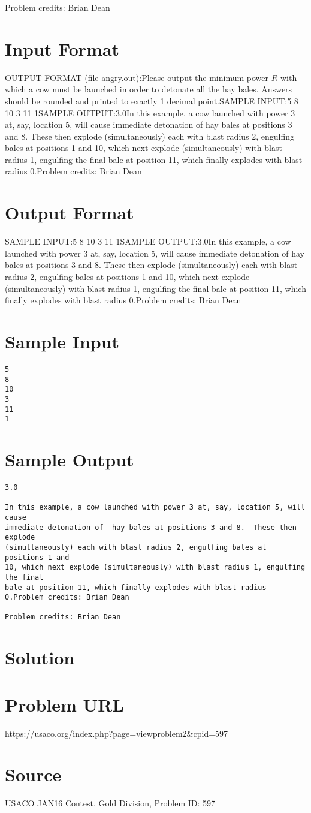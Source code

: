 \documentclass[12pt]{article}
\begin{document}
Problem credits: Brian Dean



\section*{Input Format}
OUTPUT FORMAT (file angry.out):Please output the minimum power $R$ with which a cow must be launched in order
to detonate all the hay bales.  Answers should be rounded and printed to exactly
1 decimal point.SAMPLE INPUT:5
8
10
3
11
1SAMPLE OUTPUT:3.0In this example, a cow launched with power 3 at, say, location 5, will cause
immediate detonation of  hay bales at positions 3 and 8.  These then explode
(simultaneously) each with blast radius 2, engulfing bales at positions 1 and
10, which next explode (simultaneously) with blast radius 1, engulfing the final
bale at position 11, which finally explodes with blast radius 0.Problem credits: Brian Dean

\section*{Output Format}
SAMPLE INPUT:5
8
10
3
11
1SAMPLE OUTPUT:3.0In this example, a cow launched with power 3 at, say, location 5, will cause
immediate detonation of  hay bales at positions 3 and 8.  These then explode
(simultaneously) each with blast radius 2, engulfing bales at positions 1 and
10, which next explode (simultaneously) with blast radius 1, engulfing the final
bale at position 11, which finally explodes with blast radius 0.Problem credits: Brian Dean

\section*{Sample Input}
\begin{verbatim}
5
8
10
3
11
1
\end{verbatim}

\section*{Sample Output}
\begin{verbatim}
3.0

In this example, a cow launched with power 3 at, say, location 5, will cause
immediate detonation of  hay bales at positions 3 and 8.  These then explode
(simultaneously) each with blast radius 2, engulfing bales at positions 1 and
10, which next explode (simultaneously) with blast radius 1, engulfing the final
bale at position 11, which finally explodes with blast radius 0.Problem credits: Brian Dean

Problem credits: Brian Dean
\end{verbatim}

\section*{Solution}


\section*{Problem URL}
https://usaco.org/index.php?page=viewproblem2&cpid=597

\section*{Source}
USACO JAN16 Contest, Gold Division, Problem ID: 597
\end{document}

